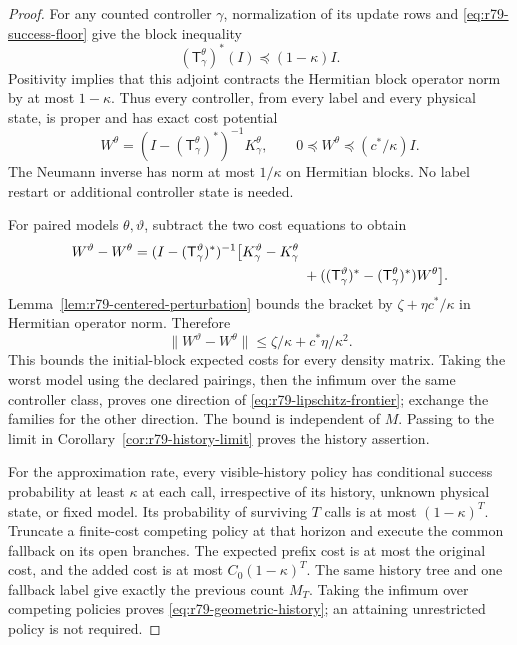 \begin{proof}
For any counted controller $\gamma$, normalization of its update
rows and \eqref{eq:r79-success-floor} give the block inequality
\[
 (\mathsf T^\theta_\gamma)^*(I)
       \preccurlyeq(1-\kappa)I.
\]
Positivity implies that this adjoint contracts the Hermitian block
operator norm by at most $1-\kappa$.  Thus every controller,
from every label and every physical state, is proper and has
exact cost potential
\[
 W^\theta=(I-(\mathsf T^\theta_\gamma)^*)^{-1}
                                     K^\theta_\gamma,
 \qquad 0\preccurlyeq W^\theta\preccurlyeq(c^*/\kappa)I.
\]
The Neumann inverse has norm at most $1/\kappa$ on Hermitian
blocks.  No label restart or additional controller state is needed.

For paired models $\theta,\vartheta$, subtract the two cost
equations to obtain
\begin{align*}
 W^\vartheta-W^\theta
  ={}&(I-(\mathsf T^\vartheta_\gamma)^*)^{-1}
       \bigl[K^\vartheta_\gamma-K^\theta_\gamma\\
   &\hspace{38mm}
       +((\mathsf T^\vartheta_\gamma)^*
                    -(\mathsf T^\theta_\gamma)^*)W^\theta\bigr].
\end{align*}
Lemma~\ref{lem:r79-centered-perturbation} bounds the bracket by
$\zeta+\eta c^*/\kappa$ in Hermitian operator norm.  Therefore
\[
 \|W^\vartheta-W^\theta\|
             \le\zeta/\kappa+c^*\eta/\kappa^2.
\]
This bounds the initial-block expected costs for every density
matrix.  Taking the worst model using the declared pairings, then
the infimum over the same controller class, proves one direction
of \eqref{eq:r79-lipschitz-frontier}; exchange the families for
the other direction.  The bound is independent of $M$.  Passing
to the limit in Corollary~\ref{cor:r79-history-limit} proves the
history assertion.

For the approximation rate, every visible-history policy has
conditional success probability at least $\kappa$ at each call,
irrespective of its history, unknown physical state, or fixed
model.  Its probability of surviving $T$ calls is at most
$(1-\kappa)^T$.  Truncate a finite-cost competing policy at that
horizon and execute the common fallback on its open branches.
The expected prefix cost is at most the original cost, and the
added cost is at most $C_0(1-\kappa)^T$.  The same history tree
and one fallback label give exactly the previous count $M_T$.
Taking the infimum over competing policies proves
\eqref{eq:r79-geometric-history}; an attaining unrestricted
policy is not required.


\end{proof}
